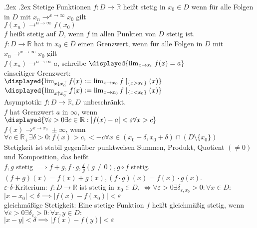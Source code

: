 \documentclass[9pt, landscape,a4paper]{extarticle}
\makeatletter
\let\bar\overline
\renewcommand{\section}{\@startsection{section}{1}{0mm}%
                                {.2ex}%
                                {.2ex}%
                                {\sffamily\small\bfseries}}
\newcommand*\abs[1]{\lvert#1\rvert}
\newcommand\eps{\varepsilon}
\makeatother
\begin{document}
\begin{multicols*}{4}
  \section{Stetige Funktionen}
  $f: D\to\mathbb{R}$ heißt stetig in $x_0 \in D$ wenn für alle Folgen in $D$ mit $x_n \to^{x\rightarrow \infty} x_0$ gilt \\
  $f(x_n) \to^{n\rightarrow \infty} f(x_0)$ \\
  $f$ heißt stetig auf $D$, wenn $f$ in allen Punkten von $D$ stetig ist. \\
  $f:D\to\mathbb{R}$ hat in $x_0 \in \bar D$ einen Grenzwert, wenn für alle Folgen in $D$ mit $x_n \to^{x\rightarrow \infty} x_0$ gilt \\
  $f(x_n) \to^{n\rightarrow \infty} a$, schreibe $\displayed{\lim_{x\to x_0} f(x) = a}$ \\
  einseitiger Grenzwert: \\
  $\displayed{\lim_{x\downarrow x_0^+} f(x) := \lim_{x\to x_0}f\mid_{\{x > x_0\}}(x)}$ \\
  $\displayed{\lim_{x\uparrow x_0^-} f(x) := \lim_{x\to x_0}f\mid_{\{x < x_0\}}(x)}$ \\
  Asymptotik: $f:D \to \mathbb{R}, D$ unbeschränkt. \\
  $f$ hat Grenzwert $a$ in $\infty$, wenn \\
  $\displayed{\forall\eps > 0 \exists c\in\mathbb{R}: \abs{f(x) - a} < \eps \forall x > c}$ \\
  $f(x) \to^{x\rightarrow x_0} \pm \infty$, wenn $\forall c \in \mathbb{R}_+ \exists \delta >0: f(x) > c, < -c \forall x\in (x_0 - \delta, x_0 + \delta) \cap (D\setminus \{x_0\})$ \\
  Stetigkeit ist stabil gegenüber punktweisen Summen, Produkt, Quotient $(\neq 0)$ und Komposition, das heißt \\
  $f, g$ stetig $\implies f + g, f\cdot g, \frac{f}{g}(g\neq 0), g\circ f$ stetig. $(f + g)(x) = f(x) + g(x), (f\cdot g)(x) = f(x)\cdot g(x)$. \\
  $\eps$-$\delta$-Kriterium: $f: D \to \mathbb{R}$ ist stetig in $x_0 \in D$, $\iff \forall \eps > 0 \exists \delta_{\eps,x_0} > 0: \forall x\in D$: \\
  $\abs{x - x_0} < \delta \implies \abs{f(x) - f(x_0)} < \eps$ \\
  gleichmäßige Stetigkeit: Eine stetige Funktion $f$ heißt gleichmäßig stetig, wenn $\forall \eps > 0 \exists \delta_\eps >0 : \forall x, y \in D:$ \\
  $\abs{x - y} < \delta \implies \abs{f(x) - f(y)} < \eps$ \\

\end{multicols*}
\end{document}
